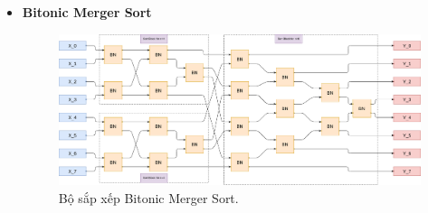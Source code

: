 \begin{itemize}[label=-]
	\item \textbf{Bitonic Merger Sort}
	
	\begin{figure}[H]
		\centering
		\includegraphics[width=\linewidth]{./my-chapters/my-diagrams/Question6/debai.png}
		\caption{Bộ sắp xếp Bitonic Merger Sort.}
	\end{figure}
\end{itemize}

















